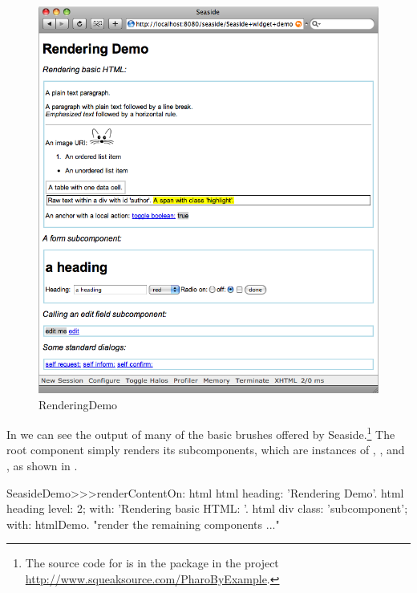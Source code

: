 \documentclass[a4paper,10pt,twoside]{book}
\begin{document}
\begin{figure}[ht]
\begin{center}
\includegraphics[width=\textwidth]{RenderingDemo}
\caption{RenderingDemo}
\label{fig:RenderingDemo}
\end{center}
\end{figure}

In  we can see the output of many of the basic brushes offered by Seaside.\footnote{The source code for  is in the package  in the project \url{http://www.squeaksource.com/PharoByExample}.}
The root component  simply renders its subcomponents, which are instances of , ,  and , as shown in .

\needspace{7ex}
\begin{method}[renderdemo]{}
SeasideDemo>>>renderContentOn: html
	html heading: 'Rendering Demo'.
	html heading
		level: 2;
		with: 'Rendering basic HTML: '.
	html div
		class: 'subcomponent';
		with: htmlDemo.
	"render the remaining components ..."
\end{method}
\end{document}
